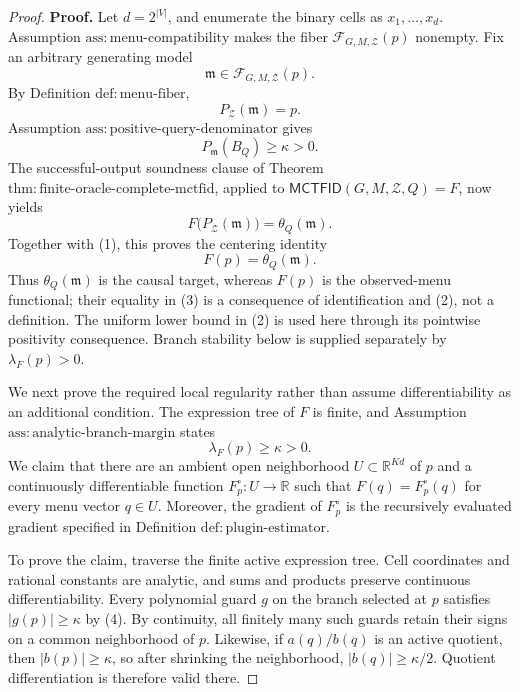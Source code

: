 \documentclass{article}
\begin{document}
\begin{proof}
\textbf{Proof.}
Let \(d=2^{|V|}\), and enumerate the binary cells as \(x_1,\ldots,x_d\).  Assumption \(\mathrm{ass:menu\text{-}compatibility}\) makes the fiber \(\mathcal F_{G,M,\mathcal Z}(p)\) nonempty.  Fix an arbitrary generating model
\[
 \mathfrak m\in\mathcal F_{G,M,\mathcal Z}(p).
\]
By Definition \(\mathrm{def:menu\text{-}fiber}\),
\[
 P_{\mathcal Z}(\mathfrak m)=p. \tag{1}
\]
Assumption \(\mathrm{ass:positive\text{-}query\text{-}denominator}\) gives
\[
 P_{\mathfrak m}(B_Q)\geq\kappa>0. \tag{2}
\]
The successful-output soundness clause of Theorem \(\mathrm{thm:finite\text{-}oracle\text{-}complete\text{-}mctfid}\), applied to \(\mathsf{MCTFID}(G,M,\mathcal Z,Q)=F\), now yields
\[
 F\bigl(P_{\mathcal Z}(\mathfrak m)\bigr)=\theta_Q(\mathfrak m).
\]
Together with (1), this proves the centering identity
\[
 F(p)=\theta_Q(\mathfrak m). \tag{3}
\]
Thus \(\theta_Q(\mathfrak m)\) is the causal target, whereas \(F(p)\) is the observed-menu functional; their equality in (3) is a consequence of identification and (2), not a definition.  The uniform lower bound in (2) is used here through its pointwise positivity consequence.  Branch stability below is supplied separately by \(\lambda_F(p)>0\).

We next prove the required local regularity rather than assume differentiability as an additional condition.  The expression tree of \(F\) is finite, and Assumption \(\mathrm{ass:analytic\text{-}branch\text{-}margin}\) states
\[
 \lambda_F(p)\geq\kappa>0. \tag{4}
\]
We claim that there are an ambient open neighborhood \(U\subset\mathbb R^{Kd}\) of \(p\) and a continuously differentiable function \(F_p^{\circ}:U\to\mathbb R\) such that \(F(q)=F_p^{\circ}(q)\) for every menu vector \(q\in U\).  Moreover, the gradient of \(F_p^{\circ}\) is the recursively evaluated gradient specified in Definition \(\mathrm{def:plugin\text{-}estimator}\).

To prove the claim, traverse the finite active expression tree.  Cell coordinates and rational constants are analytic, and sums and products preserve continuous differentiability.  Every polynomial guard \(g\) on the branch selected at \(p\) satisfies \(|g(p)|\geq\kappa\) by (4).  By continuity, all finitely many such guards retain their signs on a common neighborhood of \(p\).  Likewise, if \(a(q)/b(q)\) is an active quotient, then \(|b(p)|\geq\kappa\), so after shrinking the neighborhood, \(|b(q)|\geq\kappa/2\).  Quotient differentiation is therefore valid there.


\end{proof}
\end{document}
